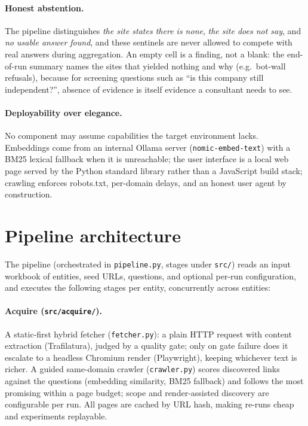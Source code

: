 \documentclass[11pt,a4paper]{report}
\begin{document}
\paragraph{Honest abstention.} The pipeline distinguishes \emph{the site
states there is none}, \emph{the site does not say}, and \emph{no usable
answer found}, and these sentinels are never allowed to compete with real
answers during aggregation. An empty cell is a finding, not a blank: the
end-of-run summary names the sites that yielded nothing and why (e.g.\
bot-wall refusals), because for screening questions such as ``is this
company still independent?'', absence of evidence is itself evidence a
consultant needs to see.

\paragraph{Deployability over elegance.} No component may assume
capabilities the target environment lacks. Embeddings come from an internal
Ollama server (\texttt{nomic-embed-text}) with a BM25 lexical fallback when
it is unreachable; the user interface is a local web page served by the
Python standard library rather than a JavaScript build stack; crawling
enforces robots.txt, per-domain delays, and an honest user agent by
construction.

\section{Pipeline architecture}

The pipeline (orchestrated in \texttt{pipeline.py}, stages under
\texttt{src/}) reads an input workbook of entities, seed URLs, questions,
and optional per-run configuration, and executes the following stages per
entity, concurrently across entities:

\paragraph{Acquire (\texttt{src/acquire/}).} A static-first hybrid fetcher
(\texttt{fetcher.py}): a plain HTTP request with content extraction
(Trafilatura), judged by a quality gate; only on gate failure does it
escalate to a headless Chromium render (Playwright), keeping whichever text
is richer. A guided same-domain crawler (\texttt{crawler.py}) scores
discovered links against the questions (embedding similarity, BM25
fallback) and follows the most promising within a page budget; scope and
render-assisted discovery are configurable per run. All pages are cached by
URL hash, making re-runs cheap and experiments replayable.
\end{document}
